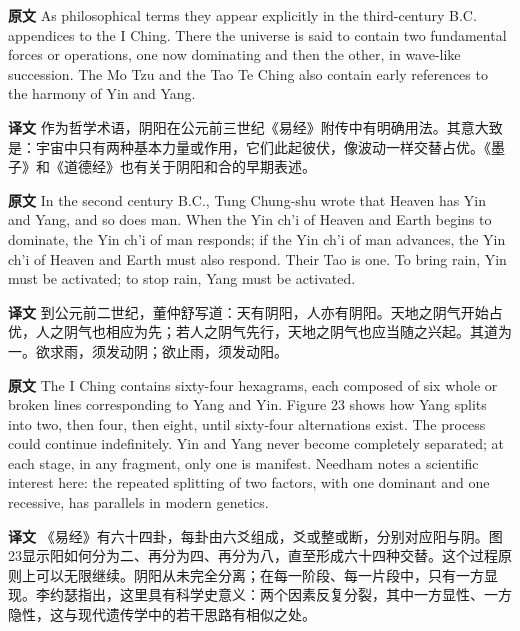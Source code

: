 \documentclass[UTF8,zihao=-4]{ctexart}
\newcommand{\BodyFont}{\fontsize{10.5pt}{15.5pt}\selectfont}
\newcommand{\origlabel}{\textbf{原文}\quad}
\newcommand{\translabel}{\textbf{译文}\quad}
\newenvironment{enblock}{\par\noindent\begingroup\BodyFont\origlabel}{\par\endgroup}
\newenvironment{zhblock}{\par\noindent\begingroup\BodyFont\translabel}{\par\endgroup\vspace{0.35em}}
\begin{document}
\begin{enblock}
As philosophical terms they appear explicitly in the third-century B.C. appendices to the I Ching. There the universe is said to contain two fundamental forces or operations, one now dominating and then the other, in wave-like succession. The Mo Tzu and the Tao Te Ching also contain early references to the harmony of Yin and Yang.
\end{enblock}
\begin{zhblock}
作为哲学术语，阴阳在公元前三世纪《易经》附传中有明确用法。其意大致是：宇宙中只有两种基本力量或作用，它们此起彼伏，像波动一样交替占优。《墨子》和《道德经》也有关于阴阳和合的早期表述。
\end{zhblock}

\begin{enblock}
In the second century B.C., Tung Chung-shu wrote that Heaven has Yin and Yang, and so does man. When the Yin ch'i of Heaven and Earth begins to dominate, the Yin ch'i of man responds; if the Yin ch'i of man advances, the Yin ch'i of Heaven and Earth must also respond. Their Tao is one. To bring rain, Yin must be activated; to stop rain, Yang must be activated.
\end{enblock}
\begin{zhblock}
到公元前二世纪，董仲舒写道：天有阴阳，人亦有阴阳。天地之阴气开始占优，人之阴气也相应为先；若人之阴气先行，天地之阴气也应当随之兴起。其道为一。欲求雨，须发动阴；欲止雨，须发动阳。
\end{zhblock}

\begin{enblock}
The I Ching contains sixty-four hexagrams, each composed of six whole or broken lines corresponding to Yang and Yin. Figure 23 shows how Yang splits into two, then four, then eight, until sixty-four alternations exist. The process could continue indefinitely. Yin and Yang never become completely separated; at each stage, in any fragment, only one is manifest. Needham notes a scientific interest here: the repeated splitting of two factors, with one dominant and one recessive, has parallels in modern genetics.
\end{enblock}
\begin{zhblock}
《易经》有六十四卦，每卦由六爻组成，爻或整或断，分别对应阳与阴。图23显示阳如何分为二、再分为四、再分为八，直至形成六十四种交替。这个过程原则上可以无限继续。阴阳从未完全分离；在每一阶段、每一片段中，只有一方显现。李约瑟指出，这里具有科学史意义：两个因素反复分裂，其中一方显性、一方隐性，这与现代遗传学中的若干思路有相似之处。
\end{zhblock}
\end{document}

